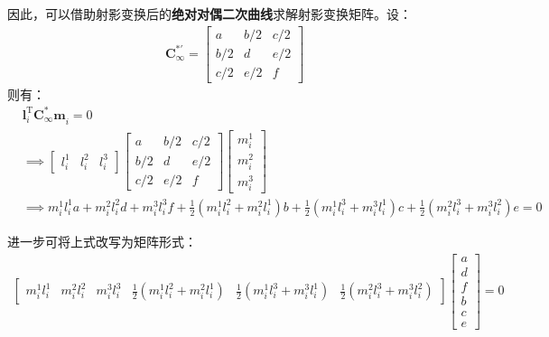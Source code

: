\documentclass[11pt]{article}
\begin{document}
\par
因此，可以借助射影变换后的\textbf{绝对对偶二次曲线}求解射影变换矩阵。设：
\begin{align*}
  \mathbf{C_\infty^{*'}}=\begin{bmatrix}
                           a   & b/2 & c/2 \\
                           b/2 & d   & e/2 \\
                           c/2 & e/2 & f
                         \end{bmatrix}
\end{align*}
则有：
\begin{align*}
   & \mathbf{l}_i^\mathrm{T}\mathbf{C_\infty^{*}m}_i=0                                                                                                          \\
   & \implies\begin{bmatrix}
               l_i^1 & l_i^2 & l_i^3
             \end{bmatrix}\begin{bmatrix}
                            a   & b/2 & c/2 \\
                            b/2 & d   & e/2 \\
                            c/2 & e/2 & f
                          \end{bmatrix}
  \begin{bmatrix}
    m_i^1 \\
    m_i^2 \\
    m_i^3
  \end{bmatrix}                                                                                                                                                \\
   & \implies m_i^1l_i^1a+m_i^2l_i^2d+m_i^3l_i^3f+\frac{1}{2}(m_i^1l_i^2+m_i^2l_i^1)b+\frac{1}{2}(m_i^1l_i^3+m_i^3l_i^1)c+\frac{1}{2}(m_i^2l_i^3+m_i^3l_i^2)e=0
\end{align*}\par
进一步可将上式改写为矩阵形式：
\begin{align}
  \begin{bmatrix}
    m_i^1l_i^1 & m_i^2l_i^2 & m_i^3l_i^3 & \frac{1}{2}(m_i^1l_i^2+m_i^2l_i^1 ) & \frac{1}{2}(m_i^1l_i^3+m_i^3l_i^1) & \frac{1}{2}(m_i^2l_i^3+m_i^3l_i^2)
  \end{bmatrix}\begin{bmatrix}
                 a \\
                 d \\
                 f \\
                 b \\
                 c \\
                 e
               \end{bmatrix}=0
  \label{eq:line}
\end{align}
\end{document}
